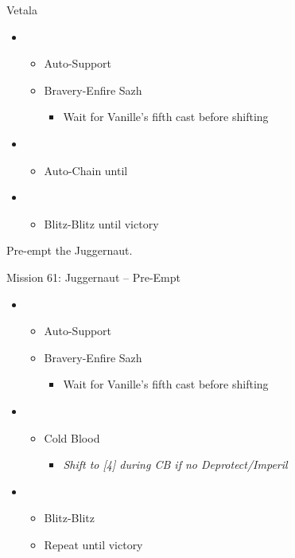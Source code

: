 \begin{battle}{Vetala}
	\begin{itemize}
		\item \fourth
			\begin{itemize}
				\item Auto-Support
				\item Bravery-Enfire Sazh
					\begin{itemize}
						\item Wait for Vanille's fifth cast before shifting
					\end{itemize}
			\end{itemize}
		\item \sixth
			\begin{itemize}
				\item Auto-Chain until \stagger
			\end{itemize}
		\item \first
			\begin{itemize}
				\item Blitz-Blitz until victory
			\end{itemize}
	\end{itemize}
\end{battle}

Pre-empt the Juggernaut.

\begin{battle}{Mission 61: Juggernaut -- Pre-Empt}
	\begin{itemize}
		\item \fourth
			\begin{itemize}
				\item Auto-Support
				\item Bravery-Enfire Sazh
					\begin{itemize}
						\item Wait for Vanille's fifth cast before shifting
					\end{itemize}
			\end{itemize}
		\item \sixth
			\begin{itemize}
				\item Cold Blood
					\begin{itemize}
						\item \textit{Shift to [4] during CB if no Deprotect/Imperil}
					\end{itemize}
			\end{itemize}
		\item \first
			\begin{itemize}
				\item Blitz-Blitz
				\item Repeat until victory
			\end{itemize}
	\end{itemize}
\end{battle}

